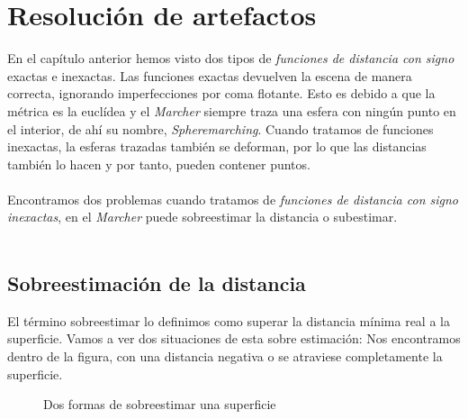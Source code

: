 \chapter{Resolución de artefactos}
En el capítulo anterior hemos visto dos tipos de \textit{funciones de distancia con signo} exactas e inexactas. Las funciones exactas devuelven la escena de manera correcta, ignorando imperfecciones por coma flotante. Esto es debido a que la métrica es la euclídea y el \textit{Marcher} siempre traza una esfera con ningún punto en el interior, de ahí su nombre, \textit{Spheremarching}. Cuando tratamos de funciones inexactas, la esferas trazadas también se deforman, por lo que las distancias también lo hacen y por tanto, pueden contener puntos. \\\\
Encontramos dos problemas cuando tratamos de \textit{funciones de distancia con signo inexactas}, en el \textit{Marcher} puede sobreestimar la distancia o subestimar. \\\\

\section{Sobreestimación de la distancia}
El término sobreestimar lo definimos como superar la distancia mínima real a la superficie. Vamos a ver dos situaciones de esta sobre estimación: Nos encontramos dentro de la figura, con una distancia negativa o se atraviese completamente la superficie. 

\begin{figure}[H]
  \centering
  \hfill
  \captionsetup{justification=centering}%
  \caption{Dos formas de sobreestimar una superficie}
\end{figure}


